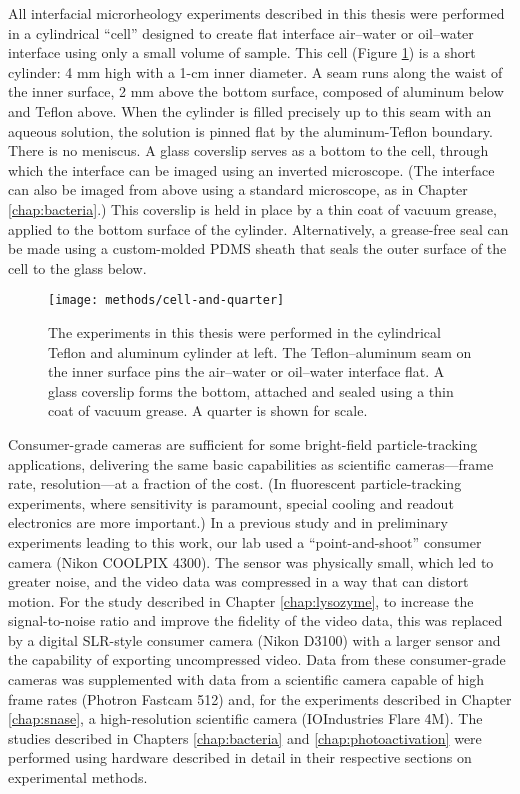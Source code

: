 All interfacial microrheology experiments described in this thesis were performed in a cylindrical ``cell'' designed to create flat interface air--water or oil--water interface using only a small volume of sample. This cell (Figure \ref{fig:cell-and-quarter}) is a short cylinder: 4 mm high with a 1-cm inner diameter. A seam runs along the waist of the inner surface, 2 mm above the bottom surface, composed of aluminum below and Teflon above. When the cylinder is filled precisely up to this seam with an aqueous solution, the solution is pinned flat by the aluminum-Teflon boundary. There is no meniscus. A glass coverslip serves as a bottom to the cell, through which the interface can be imaged using an inverted microscope. (The interface can also be imaged from above using a standard microscope, as in Chapter \ref{chap:bacteria}.) This coverslip is held in place by a thin coat of vacuum grease, applied to the bottom surface of the cylinder. Alternatively, a grease-free seal can be made using a custom-molded PDMS sheath that seals the outer surface of the cell to the glass below.

   \begin{figure}
    \centering
    \texttt{[image: methods/cell-and-quarter]}
    \caption[The Teflon and aluminum cylinder in which interfacial microrheology experiments were performed.]{\label{fig:cell-and-quarter}The experiments in this thesis were performed in the cylindrical Teflon and aluminum cylinder at left. The Teflon--aluminum seam on the inner surface pins the air--water or oil--water interface flat. A glass coverslip forms the bottom, attached and sealed using a thin coat of vacuum grease. A quarter is shown for scale.}
    \end{figure}

Consumer-grade cameras are sufficient for some bright-field particle-tracking applications, delivering the same basic capabilities as scientific cameras---frame rate, resolution---at a fraction of the cost. (In fluorescent particle-tracking experiments, where sensitivity is paramount, special cooling and readout electronics are more important.) In a previous study and in preliminary experiments leading to this work, our lab used a ``point-and-shoot'' consumer camera (Nikon COOLPIX 4300). The sensor was physically small, which led to greater noise, and the video data was compressed in a way that can distort motion. For the study described in Chapter \ref{chap:lysozyme}, to increase the signal-to-noise ratio and improve the fidelity of the video data, this was replaced by a digital SLR-style consumer camera (Nikon D3100) with a larger sensor and the capability of exporting uncompressed video. Data from these consumer-grade cameras was supplemented with data from a scientific camera capable of high frame rates (Photron Fastcam 512) and, for the experiments described in Chapter \ref{chap:snase}, a high-resolution scientific camera (IOIndustries Flare 4M). The studies described in Chapters \ref{chap:bacteria} and \ref{chap:photoactivation} were performed using hardware described in detail in their respective sections on experimental methods.

